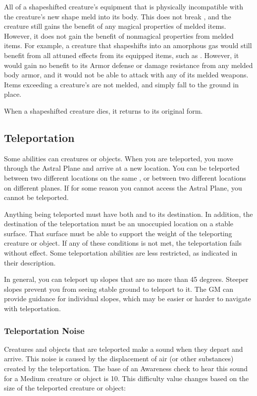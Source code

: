     All of a shapeshifted creature's equipment that is physically incompatible with the creature's new shape meld into its body.
    This does not break , and the creature still gains the benefit of any magical properties of melded items.
    However, it does not gain the benefit of nonmagical properties from melded items.
    For example, a creature that shapeshifts into an amorphous gas would still benefit from all attuned effects from its equipped items, such as .
    However, it would gain no benefit to its Armor defense or damage resistance from any melded body armor, and it would not be able to attack with any of its melded weapons.
    Items exceeding a creature's  are not melded, and simply fall to the ground in place.

    When a shapeshifted creature dies, it returns to its original form.

  \subsection{Teleportation}\label{Teleportation}
    Some abilities can  creatures or objects.
    When you are teleported, you move through the Astral Plane and arrive at a new location.
    You can be teleported between two different locations on the same , or between two different locations on different planes.
    If for some reason you cannot access the Astral Plane, you cannot be teleported.

    Anything being teleported must have both  and  to its destination.
    In addition, the destination of the teleportation must be an unoccupied location on a stable surface.
    That surface must be able to support the weight of the teleporting creature or object.
    If any of these conditions is not met, the teleportation fails without effect.
    Some teleportation abilities are less restricted, as indicated in their description.

    In general, you can teleport up slopes that are no more than 45 degrees.
    Steeper slopes prevent you from seeing stable ground to teleport to it.
    The GM can provide guidance for individual slopes, which may be easier or harder to navigate with teleportation.

    \subsubsection{Teleportation Noise}\label{Teleportation Noise}
      Creatures and objects that are teleported make a sound when they depart and arrive.
      This noise is caused by the displacement of air (or other substances) created by the teleportation.
      The base  of an Awareness check to hear this sound for a Medium creature or object is 10.
      This difficulty value changes based on the size of the teleported creature or object:


